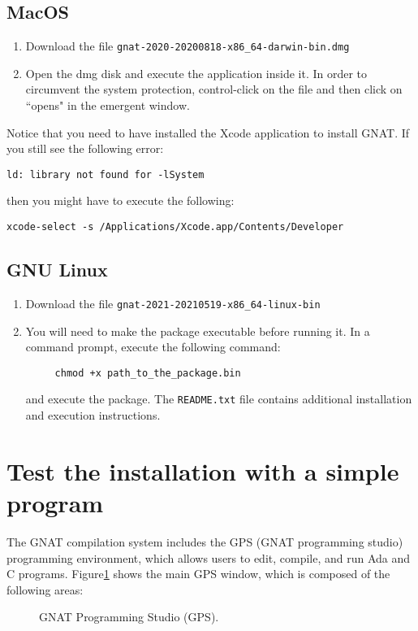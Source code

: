\subsection{MacOS}
\begin{enumerate}
\item Download the file {\tt gnat-2020-20200818-x86\_64-darwin-bin.dmg}
\item Open the dmg disk and execute the application inside it. In order to circumvent the system protection, control-click on the file and then click on ``opens" in the emergent window.
\end{enumerate}
Notice that you need to have installed the Xcode application to install GNAT. If you still see the following error:
\begin{verbatim}
ld: library not found for -lSystem
\end{verbatim}
then you might have to execute the following:
\begin{verbatim}
xcode-select -s /Applications/Xcode.app/Contents/Developer
\end{verbatim}
\subsection{GNU Linux}
\begin{enumerate}
\item Download the file {\tt gnat-2021-20210519-x86\_64-linux-bin}
\item You will need to make the package executable before running it. In a command prompt, execute the following command:
\begin{verbatim}
     chmod +x path_to_the_package.bin
\end{verbatim}
and execute the package. The {\tt README.txt} file contains additional installation and execution instructions.
\end{enumerate}

\section{Test the installation with a simple program}

The GNAT compilation system includes the GPS (GNAT programming studio) programming environment, which allows users to edit, compile, and run Ada and C programs. Figure\ref{fig:gps} shows the main GPS window, which is composed of the following areas:

\begin{figure}[h]
            \caption{GNAT Programming Studio (GPS).}
            \label{fig:gps}
\end{figure}

